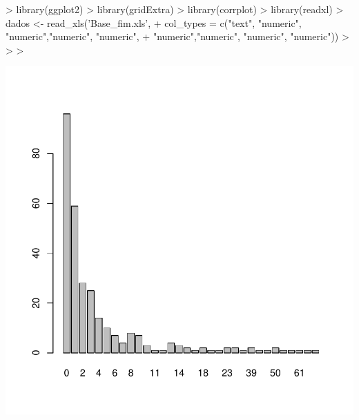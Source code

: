 \documentclass[a4paper]{article} %
\begin{document}
\begin{Schunk}
\begin{Sinput}
> library(ggplot2)
> library(gridExtra)
> library(corrplot)
> library(readxl)
> dados <- read_xls('Base_fim.xls',
+                   col_types = c("text", "numeric", "numeric","numeric", "numeric",
+                                 "numeric","numeric", "numeric", "numeric"))
> 
> 
> 
\end{Sinput}
\end{Schunk}

\begin{Schunk}
\end{Schunk}
\includegraphics{count1-002}
\end{document}
